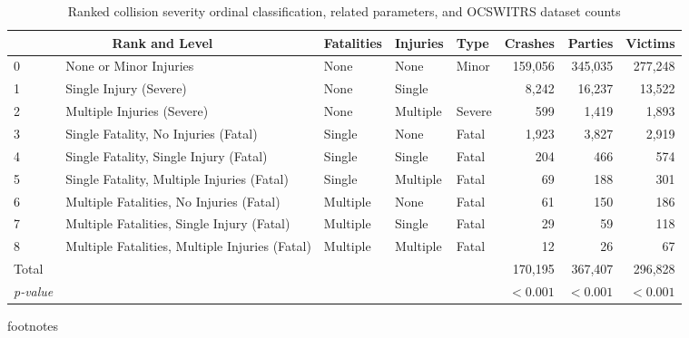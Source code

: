 \begin{table}[h]
\centering
\caption{Ranked collision severity ordinal classification, related parameters, and OCSWITRS dataset counts} 
\label{Tbl2}
\begin{tabular}{lllllrrr}
  \toprule
  \multicolumn{2}{c}{Rank and Level} & Fatalities & Injuries & Type & Crashes & Parties & Victims \\ 
 \midrule
0 & None or Minor Injuries & None & None & Minor & 159,056 & 345,035 & 277,248 \\ 
  1 & Single Injury (Severe) & None & Single &  & 8,242 & 16,237 & 13,522 \\ 
  2 & Multiple Injuries (Severe) & None & Multiple & Severe & 599 & 1,419 & 1,893 \\ 
  3 & Single Fatality, No Injuries (Fatal) & Single & None & Fatal & 1,923 & 3,827 & 2,919 \\ 
  4 & Single Fatality, Single Injury (Fatal) & Single & Single & Fatal & 204 & 466 & 574 \\ 
  5 & Single Fatality, Multiple Injuries (Fatal) & Single & Multiple & Fatal & 69 & 188 & 301 \\ 
  6 & Multiple Fatalities, No Injuries (Fatal) & Multiple & None & Fatal & 61 & 150 & 186 \\ 
  7 & Multiple Fatalities, Single Injury (Fatal) & Multiple & Single & Fatal & 29 & 59 & 118 \\ 
  8 & Multiple Fatalities, Multiple Injuries (Fatal) & Multiple & Multiple & Fatal & 12 & 26 & 67 \\ 
   \midrule 
Total &  &  &  &  & 170,195 & 367,407 & 296,828 \\ 
   \textit{p-value}\footnotemark[1] &  &  &  &  & $<0.001$ & $<0.001$ & $<0.001$ \\ 
 \bottomrule
\end{tabular}
\end{table}
footnotes \\ 
  \midrule
{} \\ 
   \bottomrule
